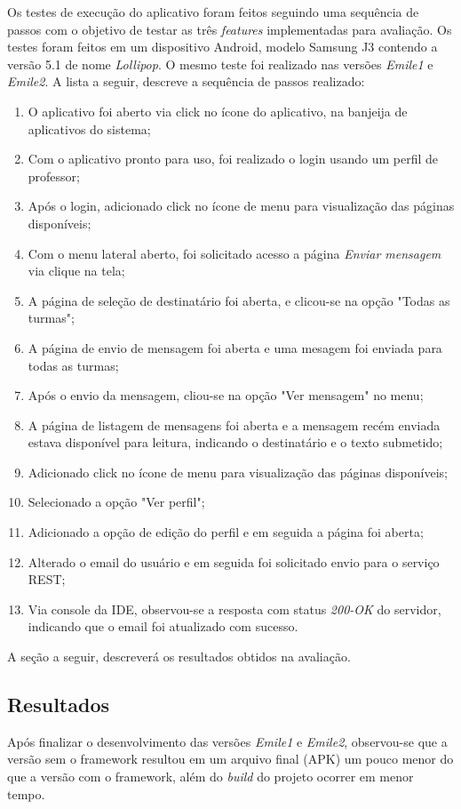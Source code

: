 Os testes de execução do aplicativo foram feitos seguindo uma sequência de passos com o objetivo de testar as três \textit{features} implementadas para avaliação. Os testes foram feitos em um dispositivo Android, modelo Samsung J3 contendo a versão 5.1 de nome \textit{Lollipop}. O mesmo teste foi realizado nas versões \textit{Emile1} e \textit{Emile2}. A lista a seguir, descreve a sequência de passos realizado:

\begin{enumerate}
	\item O aplicativo foi aberto via click no ícone do aplicativo, na banjeija de aplicativos do sistema;
	\item Com o aplicativo pronto para uso, foi realizado o login usando um perfil de professor;
	\item Após o login, adicionado click no ícone de menu para visualização das páginas disponíveis;
	\item Com o menu lateral aberto, foi solicitado acesso a página \textit{Enviar mensagem} via clique na tela;
	\item A página de seleção de destinatário foi aberta, e clicou-se na opção "Todas as turmas";
	\item A página de envio de mensagem foi aberta e uma mesagem foi enviada para todas as turmas;
	\item Após o envio da mensagem, cliou-se na opção "Ver mensagem" no menu;
	\item A página de listagem de mensagens foi aberta e a mensagem recém enviada estava disponível para leitura, indicando o destinatário e o texto submetido;
	\item Adicionado click no ícone de menu para visualização das páginas disponíveis;
	\item Selecionado a opção "Ver perfil";
	\item Adicionado a opção de edição do perfil e em seguida a página foi aberta;
	\item Alterado o email do usuário e em seguida foi solicitado envio para o serviço REST;
	\item Via console da IDE, observou-se a resposta com status \textit{200-OK} do servidor, indicando que o email foi atualizado com sucesso.
\end{enumerate}

A seção a seguir, descreverá os resultados obtidos na avaliação.


\subsection{Resultados}
Após finalizar o desenvolvimento das versões \textit{Emile1} e \textit{Emile2}, observou-se que a versão sem o framework resultou em um arquivo final (APK) um pouco menor do que a versão com o framework, além do \textit{build} do projeto ocorrer em menor tempo.

